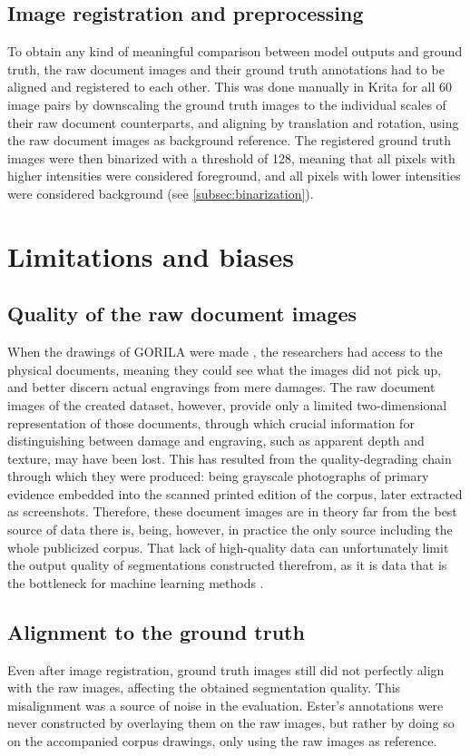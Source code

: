 \subsection{Image registration and preprocessing}
\label{subsec:registration}
To obtain any kind of meaningful comparison between model outputs and ground truth, the raw document images and their ground truth annotations had to be aligned and registered to each other.
This was done manually in Krita for all 60 image pairs by downscaling the ground truth images to the individual scales of their raw document counterparts, and aligning by translation and rotation, using the raw document images as background reference.
The registered ground truth images were then binarized with a threshold of 128, meaning that all pixels with higher intensities were considered foreground, and all pixels with lower intensities were considered background (see \cref{subsec:binarization}).
\clearpage

\section{Limitations and biases}
\subsection{Quality of the raw document images}
\label{subsec:quality_limitation}
When the drawings of \acs{GORILA} were made \parencite{EtudesCretoises21}, the researchers had access to the physical documents, meaning they could see what the images did not pick up, and better discern actual engravings from mere damages.
The raw document images of the created dataset, however, provide only a limited two-dimensional representation of those documents, through which crucial information for distinguishing between damage and engraving, such as apparent depth and texture, may have been lost.
This has resulted from the quality-degrading chain through which they were produced: being grayscale photographs of primary evidence embedded into the scanned printed edition of the corpus, later extracted as screenshots.
Therefore, these document images are in theory far from the best source of data there is, being, however, in practice the only source including the whole publicized corpus.
That lack of high-quality data can unfortunately limit the output quality of segmentations constructed therefrom, as it is data that is the bottleneck for machine learning methods \parencite{DataCentricAI}.

\subsection{Alignment to the ground truth}
\label{subsec:alignment_limitation}
Even after image registration, ground truth images still did not perfectly align with the raw images, affecting the obtained segmentation quality.
This misalignment was a source of noise in the evaluation.
Ester's annotations were never constructed by overlaying them on the raw images, but rather by doing so on the accompanied corpus drawings, only using the raw images as reference.

